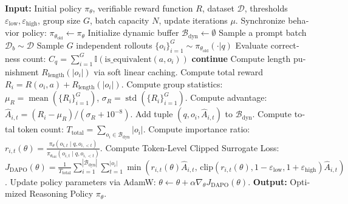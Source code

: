 \begin{latin}
\begin{algorithm}[H]
\caption{Decoupled Clip and Dynamic Sampling Policy Optimization (DAPO)}
\label{alg:dapo_algorithm}
\begin{algorithmic}[1]
\State \textbf{Input:} Initial policy $\pi_\theta$, verifiable reward function $R$, dataset $\mathcal{D}$, thresholds $\varepsilon_{\text{low}}, \varepsilon_{\text{high}}$, group size $G$, batch capacity $N$, update iterations $\mu$.
    \State Synchronize behavior policy: $\pi_{\theta_{\text{old}}} \leftarrow \pi_\theta$
    \State Initialize dynamic buffer $\mathcal{B}_{\text{dyn}} \leftarrow \emptyset$
        \State Sample a prompt batch $\mathcal{D}_b \sim \mathcal{D}$
            \State Sample $G$ independent rollouts $\{o_i\}_{i=1}^G \sim \pi_{\theta_{\text{old}}}(\cdot | q)$
            \State Evaluate correctness count: $C_q = \sum_{i=1}^G \mathbb{I}(\text{is\_equivalent}(a, o_i))$
                \State \textbf{continue} 
            \EndIf
                \State Compute length punishment $R_{\text{length}}(|o_i|)$ via soft linear caching.
                \State Compute total reward $R_i = R(o_i, a) + R_{\text{length}}(|o_i|)$.
            \EndFor
            \State Compute group statistics: $\mu_R = \operatorname{mean}(\{R_i\}_{i=1}^G)$, $\sigma_R = \operatorname{std}(\{R_i\}_{i=1}^G)$.
                \State Compute advantage: $\hat{A}_{i,t} = (R_i - \mu_R) / (\sigma_R + 10^{-8})$.
                \State Add tuple $(q, o_i, \hat{A}_{i,t})$ to $\mathcal{B}_{\text{dyn}}$.
            \EndFor
        \EndFor
    \EndWhile
        \State Compute total token count: $T_{\text{total}} = \sum_{o_i \in \mathcal{B}_{\text{dyn}}} |o_i|$.
        \State Compute importance ratio: $r_{i,t}(\theta) = \frac{\pi_\theta(o_{i,t} \mid q, o_{i,<t})}{\pi_{\theta_{\text{old}}}(o_{i,t} \mid q, o_{i,<t})}$.
        \State Compute Token-Level Clipped Surrogate Loss:
        \State \quad $J_{\text{DAPO}}(\theta) = \frac{1}{T_{\text{total}}} \sum_{i=1}^{|\mathcal{B}_{\text{dyn}}|} \sum_{t=1}^{|o_i|} \min\left( r_{i,t}(\theta)\hat{A}_{i,t}, \, \text{clip}\left(r_{i,t}(\theta), 1-\varepsilon_{\text{low}}, 1+\varepsilon_{\text{high}}\right)\hat{A}_{i,t} \right)$.
        \State Update policy parameters via AdamW: $\theta \leftarrow \theta + \alpha \nabla_\theta J_{\text{DAPO}}(\theta)$.
    \EndFor
\EndFor
\State \textbf{Output:} Optimized Reasoning Policy $\pi_\theta$.
\end{algorithmic}
\end{algorithm}
\end{latin}

